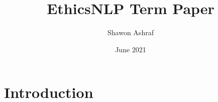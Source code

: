 \documentclass{article}
\title{EthicsNLP Term Paper}
\author{Shawon Ashraf}
\date{June 2021}
\begin{document}
\maketitle

\section{Introduction}
\end{document}
